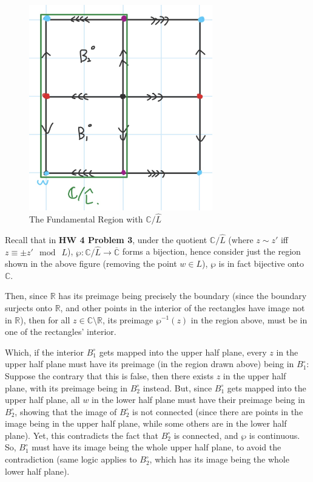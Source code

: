 \documentclass{article}
\begin{document}
\begin{itemize}
    \begin{figure}[h!]
        \begin{center}
            \includegraphics*[width=80mm]{image 4.jpg}
            \caption{The Fundamental Region with $\mathbb{C}/\widehat{L}$}
        \end{center}
    \end{figure}

    Recall that in \textbf{HW 4 Problem 3}, under the quotient $\mathbb{C}/\widehat{L}$ (where $z\sim z'$ iff $z\equiv \pm z'\mod\ L$), $\wp:\mathbb{C}/\widehat{L}\rightarrow\overline{\mathbb{C}}$ forms a bijection, hence consider just the region shown in the above figure (removing the point $w\in L$), $\wp$ is in fact bijective onto $\mathbb{C}$.

    Then, since $\mathbb{R}$ has its preimage being precisely the boundary (since the boundary surjects onto $\mathbb{R}$, and other points in the interior of the rectangles have image not in $\mathbb{R}$), then for all $z\in\mathbb{C}\setminus\mathbb{R}$, its preimage $\wp^{-1}(z)$ in the region above, must be in one of the rectangles' interior. 

    Which, if the interior $B_1^\circ$ gets mapped into the upper half plane, every $z$ in the upper half plane must have its preimage (in the region drawn above) being in $B_1^\circ$: Suppose the contrary that this is false, then there exists $z$ in the upper half plane, with its preimage being in $B_2^\circ$ instead. But, since $B_1^\circ$ gets mapped into the upper half plane, all $w$ in the lower half plane must have their preimage being in $B_2^\circ$, showing that the image of $B_2^\circ$ is not connected (since there are points in the image being in the upper half plane, while some others are in the lower half plane). Yet, this contradicts the fact that $B_2^\circ$ is connected, and $\wp$ is continuous.
    So, $B_1^\circ$ must have its image being the whole upper half plane, to avoid the contradiction (same logic applies to $B_2^\circ$, which has its image being the whole lower half plane).


\end{itemize}
\end{document}
